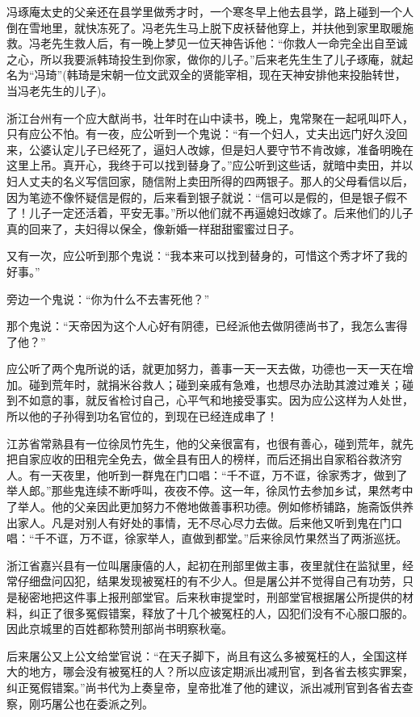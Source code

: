 \documentclass[12pt,UTF8]{ctexbook}
\begin{document}
冯琢庵太史的父亲还在县学里做秀才时，一个寒冬早上他去县学，路上碰到一个人倒在雪地里，就快冻死了。冯老先生马上脱下皮袄替他穿上，并扶他到家里取暖施救。冯老先生救人后，有一晚上梦见一位天神告诉他：“你救人一命完全出自至诚之心，所以我要派韩琦投生到你家，做你的儿子。”后来老先生生了儿子琢庵，就起名为“冯琦”(韩琦是宋朝一位文武双全的贤能宰相，现在天神安排他来投胎转世，当冯老先生的儿子)。

浙江台州有一个应大猷尚书，壮年时在山中读书，晚上，鬼常聚在一起吼叫吓人，只有应公不怕。有一夜，应公听到一个鬼说：“有一个妇人，丈夫出远门好久没回来，公婆认定儿子已经死了，逼妇人改嫁，但是妇人要守节不肯改嫁，准备明晚在这里上吊。真开心，我终于可以找到替身了。”应公听到这些话，就暗中卖田，并以妇人丈夫的名义写信回家，随信附上卖田所得的四两银子。那人的父母看信以后，因为笔迹不像怀疑信是假的，后来看到银子就说：“信可以是假的，但是银子假不了！儿子一定还活着，平安无事。”所以他们就不再逼媳妇改嫁了。后来他们的儿子真的回来了，夫妇得以保全，像新婚一样甜甜蜜蜜过日子。

又有一次，应公听到那个鬼说：“我本来可以找到替身的，可惜这个秀才坏了我的好事。”

旁边一个鬼说：“你为什么不去害死他？”

那个鬼说：“天帝因为这个人心好有阴德，已经派他去做阴德尚书了，我怎么害得了他？”

应公听了两个鬼所说的话，就更加努力，善事一天一天去做，功德也一天一天在增加。碰到荒年时，就捐米谷救人；碰到亲戚有急难，也想尽办法助其渡过难关；碰到不如意的事，就反省检讨自己，心平气和地接受事实。因为应公这样为人处世，所以他的子孙得到功名官位的，到现在已经连成串了！

江苏省常熟县有一位徐凤竹先生，他的父亲很富有，也很有善心，碰到荒年，就先把自家应收的田租完全免去，做全县有田人的榜样，而后还捐出自家稻谷救济穷人。有一天夜里，他听到一群鬼在门口唱：“千不诓，万不诓，徐家秀才，做到了举人郎。”那些鬼连续不断呼叫，夜夜不停。这一年，徐凤竹去参加乡试，果然考中了举人。他的父亲因此更加努力不倦地做善事积功德。例如修桥铺路，施斋饭供养出家人。凡是对别人有好处的事情，无不尽心尽力去做。后来他又听到鬼在门口唱：“千不诓，万不诓，徐家举人，直做到都堂。”后来徐凤竹果然当了两浙巡抚。

浙江省嘉兴县有一位叫屠康僖的人，起初在刑部里做主事，夜里就住在监狱里，经常仔细盘问囚犯，结果发现被冤枉的有不少人。但是屠公并不觉得自己有功劳，只是秘密地把这件事上报刑部堂官。后来秋审提堂时，刑部堂官根据屠公所提供的材料，纠正了很多冤假错案，释放了十几个被冤枉的人，囚犯们没有不心服口服的。因此京城里的百姓都称赞刑部尚书明察秋毫。

后来屠公又上公文给堂官说：“在天子脚下，尚且有这么多被冤枉的人，全国这样大的地方，哪会没有被冤枉的人？所以应该定期派出减刑官，到各省去核实罪案，纠正冤假错案。”尚书代为上奏皇帝，皇帝批准了他的建议，派出减刑官到各省去查察，刚巧屠公也在委派之列。
\end{document}
